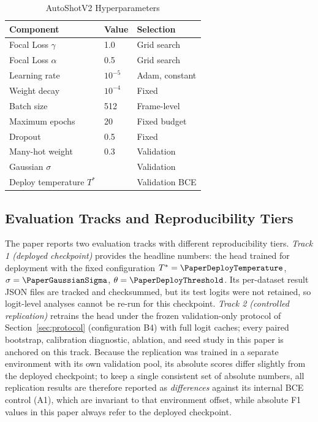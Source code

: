 \begin{table}[!t]
\caption{AutoShotV2 Hyperparameters}
\label{tab:hyperparams}
\centering
\small
\renewcommand{\arraystretch}{1.08}
\begin{tabular}{L{1.25in}C{0.7in}L{0.85in}}
\toprule
\textbf{Component} & \textbf{Value} & \textbf{Selection} \\
\midrule
Focal Loss $\gamma$ & 1.0 & Grid search \\
Focal Loss $\alpha$ & 0.5 & Grid search \\
Learning rate & $10^{-5}$ & Adam, constant \\
Weight decay & $10^{-4}$ & Fixed \\
Batch size & 512 & Frame-level \\
Maximum epochs & 20 & Fixed budget \\
Dropout & 0.5 & Fixed \\
Many-hot weight & 0.3 & Validation \\
Gaussian $\sigma$ & \PaperGaussianSigma{} & Validation \\
Deploy temperature $T^{*}$ & \PaperDeployTemperature{} & Validation BCE \\
\bottomrule
\end{tabular}
\end{table}

\subsection{Evaluation Tracks and Reproducibility Tiers}
\label{sec:tracks}

The paper reports two evaluation tracks with different reproducibility
tiers. \emph{Track 1 (deployed checkpoint)} provides the headline numbers:
the head trained for deployment with the fixed configuration
$T^{*}=\PaperDeployTemperature$, $\sigma=\PaperGaussianSigma$,
$\theta=\PaperDeployThreshold$. Its per-dataset result JSON files are
tracked and checksummed, but its test logits were not retained, so
logit-level analyses cannot be re-run for this checkpoint. \emph{Track 2
(controlled replication)} retrains the head under the frozen validation-only
protocol of Section~\ref{sec:protocol} (configuration B4) with full logit
caches; every paired bootstrap, calibration diagnostic, ablation, and seed
study in this paper is anchored on this track. Because the replication was
trained in a separate environment with its own validation pool, its absolute
scores differ slightly from the deployed checkpoint; to keep a single
consistent set of absolute numbers, all replication results are therefore
reported as \emph{differences} against its internal BCE control (A1), which
are invariant to that environment offset, while absolute F1 values in this
paper always refer to the deployed checkpoint.


